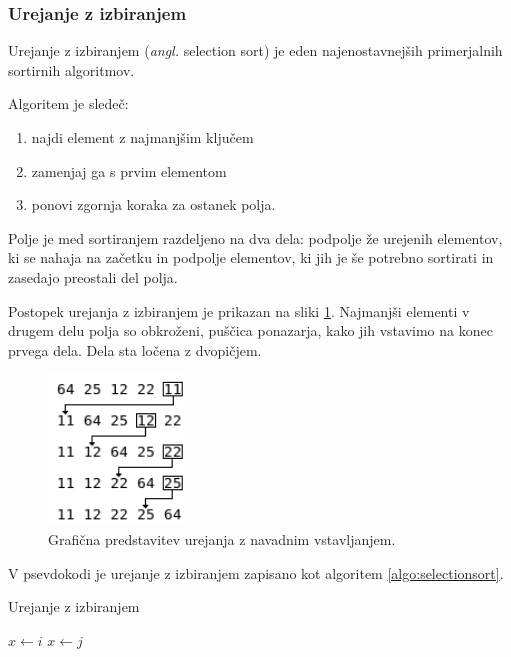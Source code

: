 \documentclass[a4paper,oneside,12pt]{article}
\begin{document}
\subsubsection{Urejanje z izbiranjem}
\label{chapter:selectionsort}
Urejanje z izbiranjem (\emph{angl.} selection sort) je eden najenostavnejših primerjalnih sortirnih
algoritmov.

Algoritem je sledeč:
\begin{enumerate}
  \item najdi element z najmanjšim ključem
  \item zamenjaj ga s prvim elementom
  \item ponovi zgornja koraka za ostanek polja.
\end{enumerate}

Polje je med sortiranjem razdeljeno na dva dela: podpolje že urejenih elementov, ki se
nahaja na začetku in podpolje elementov, ki jih je še potrebno sortirati in zasedajo
preostali del polja.

Postopek urejanja z izbiranjem je prikazan na sliki \ref{fig:selectionsortimage}.
Najmanjši elementi v drugem delu polja so obkroženi, puščica ponazarja, kako jih
vstavimo na konec prvega dela. Dela sta ločena z dvopičjem. %

\begin{figure}[h]
    \begin{center}
        \includegraphics[height=40mm]{slike/selectionsort.png}
    \end{center}
    \vspace{-0.7cm}
    \caption[Urejanje z izbiranjem]{Grafična predstavitev urejanja z navadnim vstavljanjem.}
    \label{fig:selectionsortimage}
\end{figure}

V psevdokodi je urejanje z izbiranjem zapisano kot algoritem \ref{algo:selectionsort}.

\begin{algorithm}
  \caption{Urejanje z izbiranjem}\label{algo:selectionsort}
  \begin{algorithmic}[1]
            \State $x \gets i$
                    \State $x \gets j$
                \EndIf
            \EndFor
        \EndFor
    \EndFunction
  \end{algorithmic}
\end{algorithm}
\end{document}
